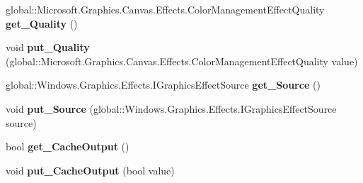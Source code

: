 \begin{DoxyCompactItemize}
\item 
\mbox{\label{class_microsoft_1_1_graphics_1_1_canvas_1_1_effects_1_1_color_management_effect_a74e8b9b83a4d172f56e20953dd051a26}} 
global\+::\+Microsoft.\+Graphics.\+Canvas.\+Effects.\+Color\+Management\+Effect\+Quality {\bfseries get\+\_\+\+Quality} ()
\item 
\mbox{\label{class_microsoft_1_1_graphics_1_1_canvas_1_1_effects_1_1_color_management_effect_a4316f7588b101afd626da8698742b520}} 
void {\bfseries put\+\_\+\+Quality} (global\+::\+Microsoft.\+Graphics.\+Canvas.\+Effects.\+Color\+Management\+Effect\+Quality value)
\item 
\mbox{\label{class_microsoft_1_1_graphics_1_1_canvas_1_1_effects_1_1_color_management_effect_a9670ef40f037787138a9f7733b34edc3}} 
global\+::\+Windows.\+Graphics.\+Effects.\+I\+Graphics\+Effect\+Source {\bfseries get\+\_\+\+Source} ()
\item 
\mbox{\label{class_microsoft_1_1_graphics_1_1_canvas_1_1_effects_1_1_color_management_effect_a64b0b058d7f8bf487791409141270602}} 
void {\bfseries put\+\_\+\+Source} (global\+::\+Windows.\+Graphics.\+Effects.\+I\+Graphics\+Effect\+Source source)
\item 
\mbox{\label{class_microsoft_1_1_graphics_1_1_canvas_1_1_effects_1_1_color_management_effect_a20c5884547307142f41adb0bfd16ab29}} 
bool {\bfseries get\+\_\+\+Cache\+Output} ()
\item 
\mbox{\label{class_microsoft_1_1_graphics_1_1_canvas_1_1_effects_1_1_color_management_effect_a18b489137883ce9492e9aaf73e430cfa}} 
void {\bfseries put\+\_\+\+Cache\+Output} (bool value)
\item 
\mbox{\label{class_microsoft_1_1_graphics_1_1_canvas_1_1_effects_1_1_color_management_effect_ad75bce97e7aa6d28ff473016910c2f71}} 

\end{DoxyCompactItemize}
